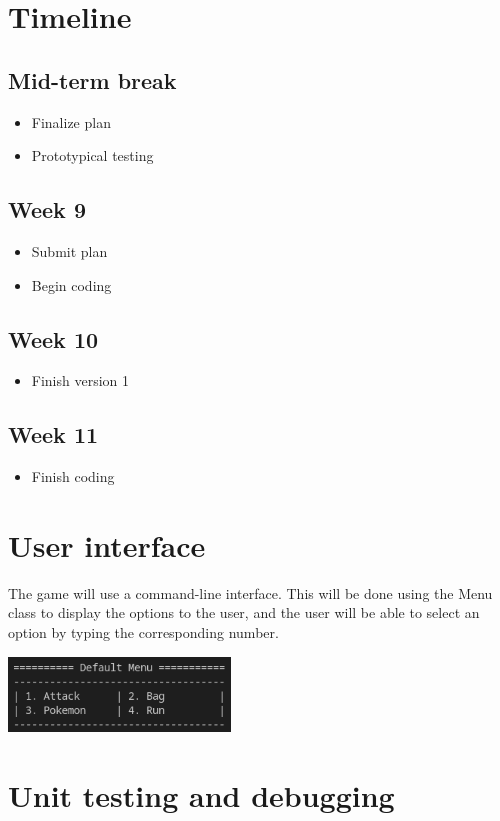 \documentclass{article}
\begin{document}
  \section{Timeline}
  
  \subsection*{Mid-term break}
  \begin{itemize}
    \item Finalize plan
    \item Prototypical testing
  \end{itemize}
  
  \subsection*{Week 9}
  \begin{itemize}
    \item Submit plan
    \item Begin coding
  \end{itemize}
  
  \subsection*{Week 10}
  \begin{itemize}
    \item Finish version 1
  \end{itemize}
  
  \subsection*{Week 11}
  \begin{itemize}
    \item Finish coding
  \end{itemize}
  
  \pagebreak
  
  \section{User interface}
  
  The game will use a command-line interface. This will be done using the Menu class to display the options to the user, and the user will be able to select an option by typing the corresponding number. 
  
  \begin{center}\includegraphics[height=2cm]{media/Menu.png}\end{center}
  
  \section{Unit testing and debugging}
    
\end{document}
